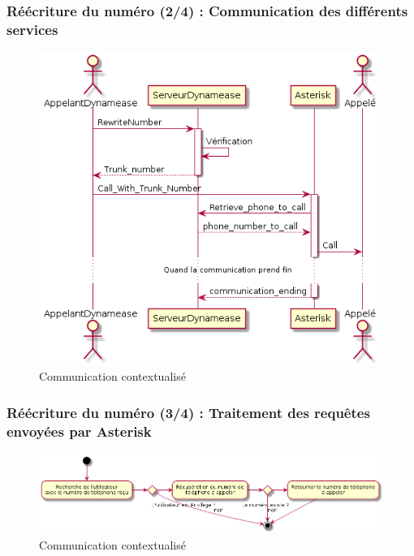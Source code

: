 \begin{frame}
	\frametitle{Réécriture du numéro (2/4) : Communication des différents services}

	\begin{center}
	  \begin{figure}
        \includegraphics[scale=0.30]{images/sequence_rewirte.png}
	   \caption{Communication contextualisé}
	  \end{figure}
	\end{center}
\end{frame}

\begin{frame}
	\frametitle{Réécriture du numéro (3/4) : Traitement des requêtes envoyées par Asterisk}

	\begin{center}
	  \begin{figure}
        \includegraphics[scale=0.30]{images/activity_rewrite_ast.png}
	   \caption{Communication contextualisé}
	  \end{figure}
	\end{center}
\end{frame}

